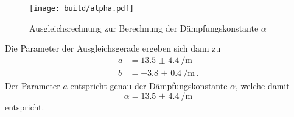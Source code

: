 \begin{figure}
    \centering
    \texttt{[image: build/alpha.pdf]}
    \caption{Ausgleichsrechnung zur Berechnung der Dämpfungskonstante $\alpha$}
    \label{fig:alpha}
\end{figure}

Die Parameter der Ausgleichsgerade ergeben sich dann zu 
\begin{align}
    a &= \SI{13.5(44)}{\per\metre} \\
    b &= \SI{-3.8(04)}{\per\metre}\,.
\end{align}
Der Parameter $a$ entspricht genau der Dämpfungskonstante $\alpha$, welche damit 
\begin{equation}
    \alpha = \SI{13.5(44)}{\per\m}
\end{equation}
entspricht. 
